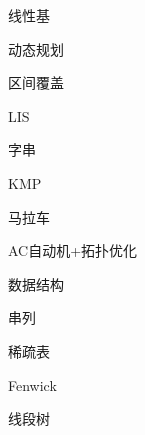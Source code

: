 \documentclass{article}
\begin{document}
\begin{enumerate}
\begin{itemize}
	{\bf \item 线性基}
	
	
	\end{itemize}

{\bf \LARGE \item  动态规划}

	\begin{itemize}
	
	{\bf \item 区间覆盖}
		
	
	{\bf \item  LIS}
		
	
	
	\end{itemize}

{\bf \LARGE \item  字串}

	\begin{itemize}
	
	{\bf \item KMP}
		
	
	{\bf \item 马拉车}
		
	
	{\bf \item AC自动机+拓扑优化}
	
		
	
	\end{itemize}
	

{\bf \LARGE \item  数据结构}

	\begin{itemize}
	
	{\bf \item 串列}
		
	
	{\bf \item 稀疏表}
				
	
	{\bf \item Fenwick}
	

	{\bf \item 线段树}
	
		
	\end{itemize}



\end{enumerate}
\end{document}
